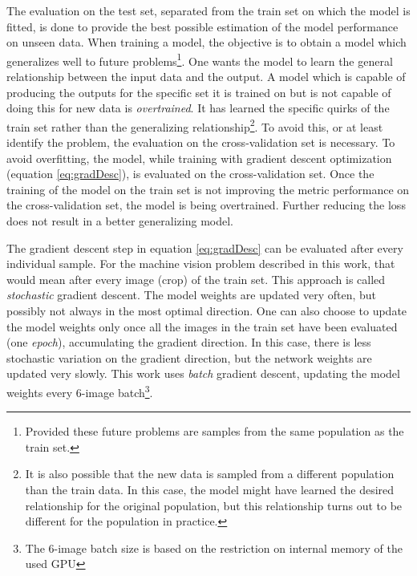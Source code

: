 \par{
    The evaluation on the test set, separated from the train set on which the model is fitted, is done to provide the best possible estimation of the model performance on unseen data.
    When training a model, the objective is to obtain a model which generalizes well to future problems\footnote{
        Provided these future problems are samples from the same population as the train set.
    }. One wants the model to learn the general relationship between the input data and the output.
    A model which is capable of producing the outputs for the specific set it is trained on but is not capable of doing this for new data is \textit{overtrained}.
    It has learned the specific quirks of the train set rather than the generalizing relationship\footnote{
        It is also possible that the new data is sampled from a different population than the train data.
        In this case, the model might have learned the desired relationship for the original population, but this relationship turns out to be different for the population in practice.
        }.
    To avoid this, or at least identify the problem, the evaluation on the cross-validation set is necessary.
    To avoid overfitting, the model, while training with gradient descent optimization (equation \ref{eq:gradDesc}), is evaluated on the cross-validation set.
    Once the training of the model on the train set is not improving the metric performance on the cross-validation set, the model is being overtrained.
    Further reducing the loss does not result in a better generalizing model.
}
\par{
    The gradient descent step in equation \ref{eq:gradDesc} can be evaluated after every individual sample.
    For the machine vision problem described in this work, that would mean after every image (crop) of the train set.
    This approach is called \textit{stochastic} gradient descent. The model weights are updated very often, but possibly not always in the most optimal direction.
    One can also choose to update the model weights only once all the images in the train set have been evaluated (one \textit{epoch}), accumulating the gradient direction.
    In this case, there is less stochastic variation on the gradient direction, but the network weights are updated very slowly.
    This work uses \textit{batch} gradient descent, updating the model weights every 6-image batch\footnote{The 6-image batch size is based on the restriction on internal memory of the used GPU}.
}

